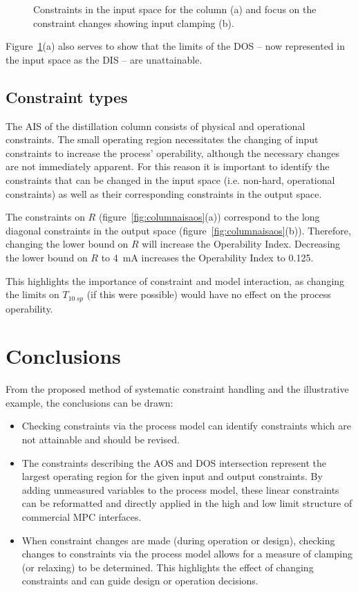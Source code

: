 \documentclass[final,authoryear,5pt,times,twocolumn]{elsarticle}
\begin{document}
\begin{figure}[htbp]
  \centering
    \scalebox{1}{}
    \scalebox{1}{}
  \caption{Constraints in the input space for the column (a) and focus on the constraint changes showing input clamping (b).}
  \label{fig:columnconsinput}
\end{figure}

Figure~\ref{fig:columnconsinput}(a) also serves to show that the limits of the DOS -- now represented in the input space as the DIS -- are unattainable.

\subsection{Constraint types}
The AIS of the distillation column consists of physical and operational constraints.
The small operating region necessitates the changing of input constraints to increase the process' operability, although the necessary changes are not immediately apparent.
For this reason it is important to identify the constraints that can be changed in the input space (i.e. non-hard, operational constraints) as well as their corresponding constraints in the output space.

The constraints on $R$ (figure~\ref{fig:columnaisaos}(a)) correspond to the long diagonal constraints in the output space (figure~\ref{fig:columnaisaos}(b)).
Therefore, changing the lower bound on $R$ will increase the Operability Index.
Decreasing the lower bound on $R$ to 4~mA increases the Operability Index to 0.125.

This highlights the importance of constraint and model interaction, as changing the limits on $T_{10~sp}$ (if this were possible) would have no effect on the process operability.


\section{Conclusions}\label{sec:conclusions}
From the proposed method of systematic constraint handling and the illustrative example, the conclusions can be drawn:
\begin{itemize}
  \item Checking constraints via the process model can identify constraints which are not attainable and should be revised.
  \item The constraints describing the AOS and DOS intersection represent the largest operating region for the given input and output constraints.
By adding unmeasured variables to the process model, these linear constraints can be reformatted and directly applied in the high and low limit structure of commercial MPC interfaces.
  \item When constraint changes are made (during operation or design), checking changes to constraints via the process model allows for a measure of clamping (or relaxing) to be determined.
This highlights the effect of changing constraints and can guide design or operation decisions.
\end{itemize}
\end{document}
